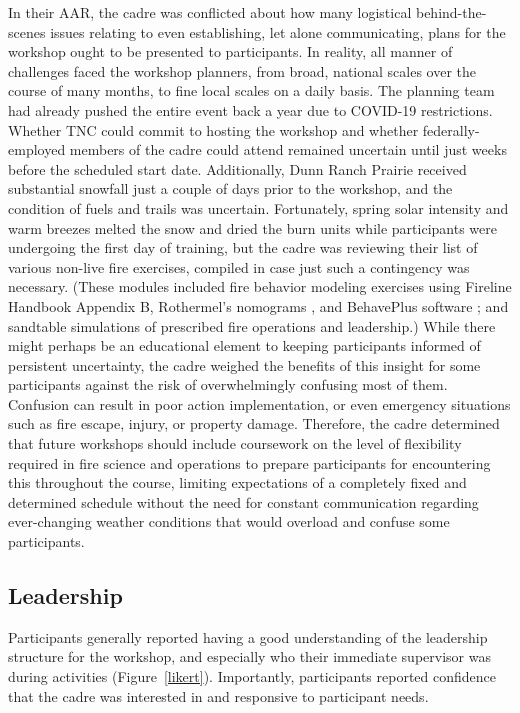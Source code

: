 \documentclass[fire,casereport,accept,moreauthors,pdftex]{Definitions/mdpi}  %
\begin{document}
In their AAR, the cadre was conflicted about how many logistical behind-the-scenes issues relating to even establishing, let alone communicating, plans for the workshop ought to be presented to participants.
In reality, all manner of challenges faced the workshop planners, from broad, national scales over the course of many months, to fine local scales on a daily basis.
The planning team had already pushed the entire event back a year due to COVID-19 restrictions.
Whether TNC could commit to hosting the workshop and whether federally-employed members of the cadre could attend remained uncertain until just weeks before the scheduled start date.
Additionally, Dunn Ranch Prairie received substantial snowfall just a couple of days prior to the workshop, and the condition of fuels and trails was uncertain.
Fortunately, spring solar intensity and warm breezes melted the snow and dried the burn units while participants were undergoing the first day of training, but the cadre was reviewing their list of various non-live fire exercises, compiled in case just such a contingency was necessary.
(These modules included fire behavior modeling exercises using Fireline Handbook Appendix B, Rothermel's nomograms \citep{rothermel1983}, and BehavePlus software \citep{heinsch2010}; and sandtable simulations of prescribed fire operations and leadership.)
While there might perhaps be an educational element to keeping participants informed of persistent uncertainty, the cadre weighed the benefits of this insight for some participants against the risk of overwhelmingly confusing most of them.
Confusion can result in poor action implementation, or even emergency situations such as fire escape, injury, or property damage. 
Therefore, the cadre determined that future workshops should include coursework on the level of flexibility required in fire science and operations to prepare participants for encountering this throughout the course, limiting expectations of a completely fixed and determined schedule without the need for constant communication regarding ever-changing weather conditions that would overload and confuse some participants.

\subsection{Leadership}

Participants generally reported having a good understanding of the leadership structure for the workshop, and especially who their immediate supervisor was during activities (Figure~\ref{likert}).
Importantly, participants reported confidence that the cadre was interested in and responsive to participant needs.
\end{document}
